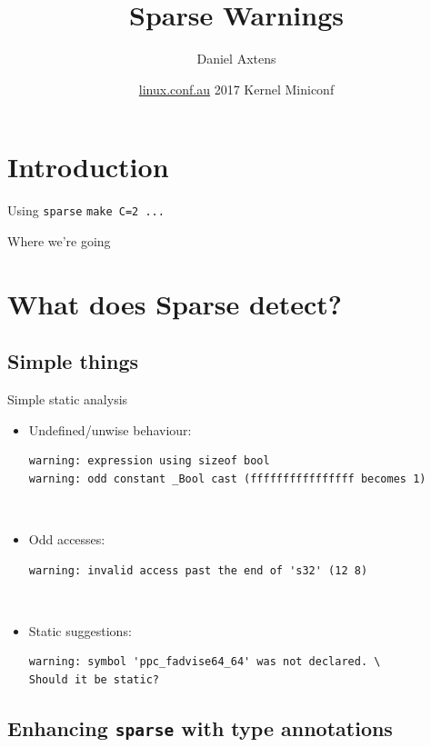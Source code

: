 \documentclass[pdf,aspectratio=169]{beamer}
\author{Daniel Axtens}
\date{\url{linux.conf.au} 2017 Kernel Miniconf}
\title{Sparse Warnings}
\begin{document}
\begin{frame}
  \titlepage
\end{frame}

\section{Introduction}
\label{sec-1}

\begin{frame}[c]{Using \texttt{sparse}}
\centering\Large
\texttt{make C=2 ...}
\end{frame}

\begin{frame}{Where we're going}
\tableofcontents
\end{frame}

\section{What does Sparse detect?}
\label{sec-2}

\subsection{Simple things}
\label{sec-2-1}

\begin{frame}[fragile]{Simple static analysis}
\begin{itemize}
\item Undefined/unwise behaviour:
\begin{verbatim}
warning: expression using sizeof bool
warning: odd constant _Bool cast (ffffffffffffffff becomes 1)
\end{verbatim}~\

\item Odd accesses:

\begin{verbatim}
warning: invalid access past the end of 's32' (12 8)
\end{verbatim}
~\

\item Static suggestions:

\begin{verbatim}
warning: symbol 'ppc_fadvise64_64' was not declared. \
Should it be static?
\end{verbatim}

\end{itemize}  
\end{frame}


\subsection{Enhancing \texttt{sparse} with type annotations}
\label{sec-2-2}
\end{document}
